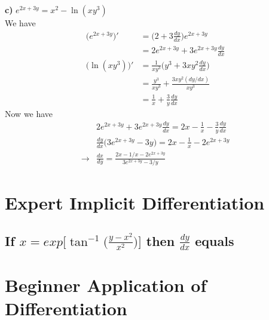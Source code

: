 \documentclass{article}
\begin{document}
\textbf{c)} $e^{2x+3y} = x^2 - \ln(xy^3)$ \\
We have
\begin{align*}
    \Big(e^{2x+3y}\Big)' &= \Big(2 + 3\frac{dy}{dx}\Big) e^{2x+3y} \\
                        &= 2e^{2x+3y} + 3e^{2x+3y}\frac{dy}{dx} \\
    \Big(\ln(xy^3)\Big)' &= \frac{1}{xy^3}\Big(y^3 + 3xy^2\frac{dy}{dx}\Big) \\
                        &= \frac{y^3}{xy^3} + \frac{3xy^2(dy/dx)}{xy^3} \\
                        &= \frac{1}{x} + \frac{3}{y}\frac{dy}{dx}
\end{align*}
Now we have
\begin{align*}
    &2e^{2x+3y} + 3e^{2x+3y}\frac{dy}{dx} = 2x - \frac{1}{x} - \frac{3}{y}\frac{dy}{dx} \\
    &\frac{dy}{dx}\Big(3e^{2x+3y} - 3y\Big) = 2x - \frac{1}{x} - 2e^{2x+3y} \\
    \rightarrow &\frac{dx}{dy} = \frac{2x - 1/x - 2e^{2x+3y}}{3e^{2x+3y} - 3/y}
\end{align*}


\section{Expert Implicit Differentiation}

\subsection{If $x = exp\Bigg[\tan^{-1}\Big(\frac{y-x^2}{x^2}\Big) \Bigg]$ then $\frac{dy}{dx}$ equals}


\section{Beginner Application of Differentiation}
\end{document}
